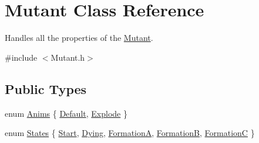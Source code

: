 \hypertarget{class_mutant}{}\section{Mutant Class Reference}
\label{class_mutant}


Handles all the properties of the \hyperlink{class_mutant}{Mutant}.  




{\ttfamily \#include $<$Mutant.\+h$>$}

\subsection*{Public Types}
\begin{DoxyCompactItemize}
\item 
enum \hyperlink{class_mutant_a0b6d537f129ebc093f65e745a25eaf6a}{Anims} \{ \hyperlink{class_mutant_a0b6d537f129ebc093f65e745a25eaf6aa73a5536e612268909b171724bbb2a002}{Default}, 
\hyperlink{class_mutant_a0b6d537f129ebc093f65e745a25eaf6aa1883289f1eacf499d4142bf779202949}{Explode}
 \}
\item 
enum \hyperlink{class_mutant_a508d3c9d254807091259a620bbf77209}{States} \{ \newline
\hyperlink{class_mutant_a508d3c9d254807091259a620bbf77209a8d0b9823bfe10057d91ac5222ef86bfc}{Start}, 
\hyperlink{class_mutant_a508d3c9d254807091259a620bbf77209ae11da7182d95dacee973bbb21c0693ad}{Dying}, 
\hyperlink{class_mutant_a508d3c9d254807091259a620bbf77209a7fab13c7c339486920f8372a69f1e541}{FormationA}, 
\hyperlink{class_mutant_a508d3c9d254807091259a620bbf77209af42129159ef9e4228065426e0db479e7}{FormationB}, 
\newline
\hyperlink{class_mutant_a508d3c9d254807091259a620bbf77209ae5caa138a87f21ff544dac38f1475eb5}{FormationC}
 \}
\end{DoxyCompactItemize}
